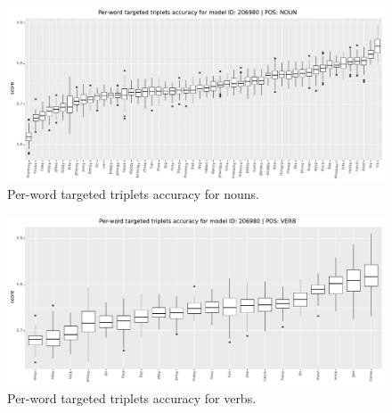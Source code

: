 \begin{figure}[htb]
  \centering
  \includegraphics[width=\textwidth]{results/targeted_triplets/results_per_word_version_206980_NOUN.pdf}
  \caption{Per-word targeted triplets accuracy for nouns.}
  \label{fig:accuracy_targeted_triplets_nouns}
\end{figure}

\begin{figure}[htb]
  \centering
  \includegraphics[width=\textwidth]{results/targeted_triplets/results_per_word_version_206980_VERB.pdf}
  \caption{Per-word targeted triplets accuracy for verbs.}
  \label{fig:accuracy_targeted_triplets_verbs}
\end{figure}
